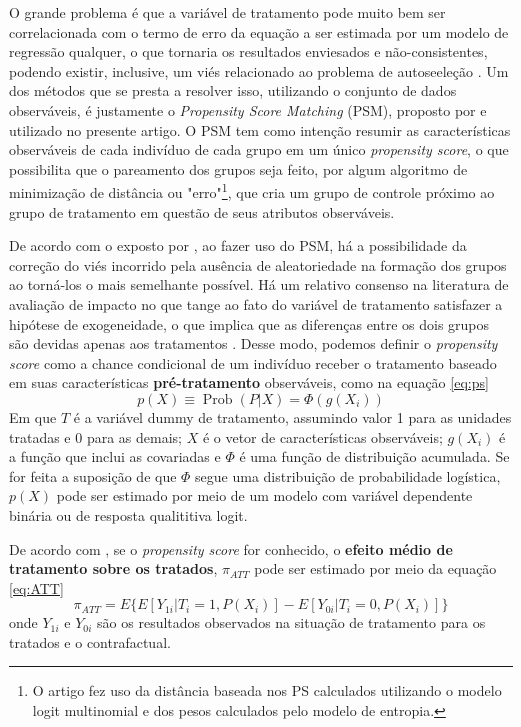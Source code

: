 O grande problema é que a variável de tratamento pode muito bem ser correlacionada com o termo de erro da equação a ser estimada por um modelo de regressão qualquer, o que tornaria os resultados enviesados e não-consistentes, podendo existir, inclusive, um viés relacionado ao problema de autoseeleção \cite{Heckman1979}. Um dos métodos que se presta a resolver isso, utilizando o conjunto de dados observáveis, é justamente o \textit{Propensity Score Matching} (PSM), proposto por  e utilizado no presente artigo. O PSM tem como intenção resumir as características observáveis de cada indivíduo de cada grupo em um único \textit{propensity score}, o que possibilita que o pareamento dos grupos seja feito, por algum algoritmo de minimização de distância ou "erro"\footnote{O artigo fez uso da distância baseada nos PS calculados utilizando o modelo logit multinomial e dos pesos calculados pelo modelo de entropia.}, que cria um grupo de controle próximo ao grupo de tratamento em questão de seus atributos observáveis.

De acordo com o exposto por , ao fazer uso do PSM, há a possibilidade da correção do viés incorrido pela ausência de aleatoriedade na formação dos grupos ao torná-los o mais semelhante possível. Há um relativo consenso na literatura de avaliação de impacto no que tange ao fato do variável de tratamento satisfazer a hipótese de exogeneidade, o que implica que as diferenças entre os dois grupos são devidas apenas aos tratamentos \cite{Caliendo2008}. Desse modo, podemos definir o \textit{propensity score} como a chance condicional de um indivíduo receber o tratamento baseado em suas características \textbf{pré-tratamento} observáveis, como na equação \ref{eq:ps} 
\begin{equation} \label{eq:ps} \tag{3.1.3}
p(X) \equiv \operatorname{Prob}(P|X) = \Phi(g(X_i))
\end{equation}
Em que $T$ é a variável dummy de tratamento, assumindo valor 1 para as unidades tratadas e 0 para as demais; $X$ é o vetor de características observáveis; $g(X_i)$ é a função que inclui as covariadas e $\Phi$ é uma função de distribuição acumulada. Se for feita a suposição de que $\Phi$ segue uma distribuição de probabilidade logística, $p(X)$ pode ser estimado por meio de um modelo com variável dependente binária ou de resposta qualititiva logit.

De acordo com , se o \textit{propensity score} for conhecido, o \textbf{efeito médio de tratamento sobre os tratados}, $\pi_{ATT}$ pode ser estimado por meio da equação \ref{eq:ATT}
\begin{equation} \label{eq:ATT} \tag{3.1.4}
\pi_{ATT} = E\{E[Y_{1i}|T_i = 1, P(X_i)] - E[
Y_{0i}|T_i = 0, P(X_i)]\}
\end{equation} 
onde $Y_{1i}$ e $Y_{0i}$ são os resultados observados na situação de tratamento para os tratados e o contrafactual.

